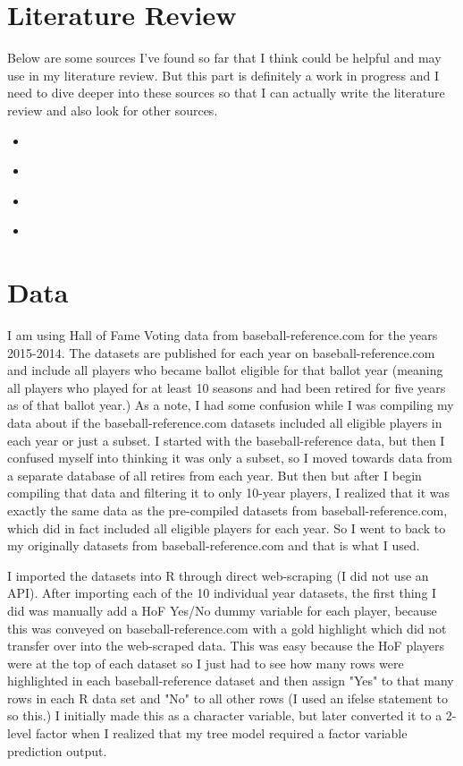 \documentclass[12pt]{article}
\begin{document}
\section{Literature Review}
\setlength{\parindent}{15pt}
Below are some sources I've found so far that I think could be helpful and may use in my literature review. But this part  is definitely a work in progress and I need to dive deeper into these sources so that I can actually write the literature review and also look for other sources.
\begin{itemize}
\item \cite{koseler2018}
\item \cite{ishii2016}
\item \cite{hoang2015}
\item \cite{soto2016}
\end{itemize}


\section{Data}
\setlength{\parindent}{15pt}
I am using Hall of Fame Voting data from baseball-reference.com for the years 2015-2014. The datasets are published for each year on baseball-reference.com and include all players who became ballot eligible for that ballot year (meaning all players who played for at least 10 seasons and had been retired for five years as of that ballot year.) As a note, I had some confusion while I was compiling my data about if the baseball-reference.com datasets included all eligible players in each year or just a subset. I started with the baseball-reference data, but then I confused myself into thinking it was only a subset, so I moved towards data from a separate database of all retires from each year. But then but after I begin compiling that data and filtering it to only 10-year players, I realized that it was exactly the same data as the pre-compiled datasets from baseball-reference.com, which did in fact included all eligible players for each year. So I went to back to my originally datasets from baseball-reference.com and that is what I used. 

I imported the datasets into R through direct web-scraping (I did not use an API). After importing each of the 10 individual year datasets, the first thing I did was manually add a HoF Yes/No dummy variable for each player, because this was conveyed on baseball-reference.com with a gold highlight which did not transfer over into the web-scraped data. This was easy because the HoF players were at the top of each dataset so I just had to see how many rows were highlighted in each baseball-reference dataset and then assign "Yes" to that many rows in each R data set and "No" to all other rows (I used an ifelse statement to so this.) I initially made this as a character variable, but later converted it to a 2-level factor when I realized that my tree model required a factor variable prediction output. 
\end{document}

